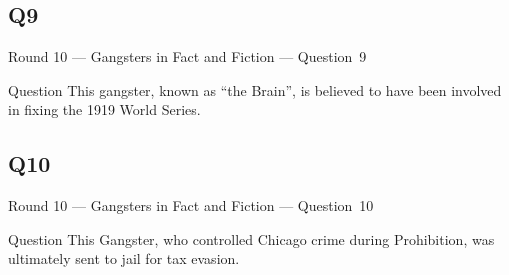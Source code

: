 \documentclass[11pt]{beamer}
\begin{document}
\subsection*{Q9}
\begin{frame}[t]{Round 10 --- Gangsters in Fact and Fiction --- \mbox{Question 9}}
\begin{block}{Question}
This gangster, known as ``the Brain'', is believed to have been involved in fixing the 1919 World Series.
\end{block}
\end{frame}
\subsection*{Q10}
\begin{frame}[t]{Round 10 --- Gangsters in Fact and Fiction --- \mbox{Question 10}}
\begin{block}{Question}
This Gangster, who controlled Chicago crime during Prohibition, was ultimately sent to jail for tax evasion.
\end{block}
\end{frame}
\end{document}
